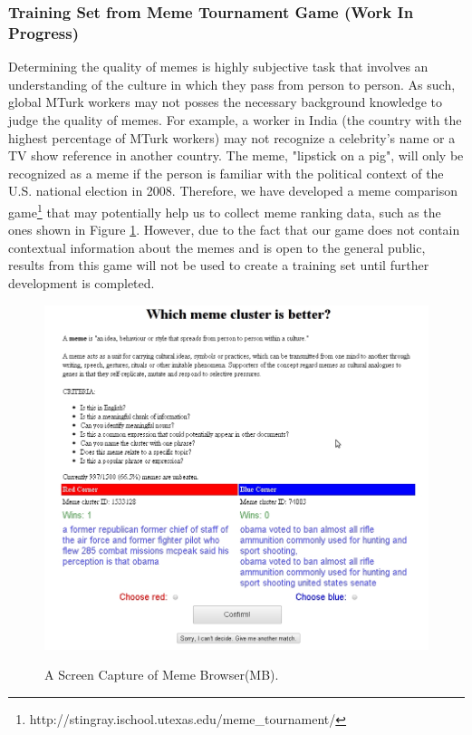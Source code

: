 \documentclass{sig-alternate}
\begin{document}
\subsubsection{Training Set from Meme Tournament Game (Work In Progress)}
Determining the quality of memes is highly subjective task that involves an understanding of the culture in which they pass from person to person. As such, global MTurk workers may not posses the necessary background knowledge to judge the quality of memes. For example, a worker in India (the country with the highest percentage of MTurk workers) may not recognize a celebrity's name or a TV show reference in another country. The meme, "lipstick on a pig", will only be recognized as a meme if the person is familiar with the political context of the U.S. national election in 2008. Therefore, we have developed a meme comparison game\footnote{http://stingray.ischool.utexas.edu/meme\_tournament/} that may potentially help us to collect meme ranking data, such as the ones shown in Figure \ref{fig:game}. However, due to the fact that our game does not contain contextual information about the memes and is open to the general public, results from this game will not be used to create a training set until further development is completed.

\begin{figure}[htb]
	\begin{center}
		{\includegraphics[width=\textwidth]{game.jpg}}
	\end{center}
	\caption{A Screen Capture of Meme Browser(MB).}
	\label{fig:game}
\end{figure}
\end{document}
